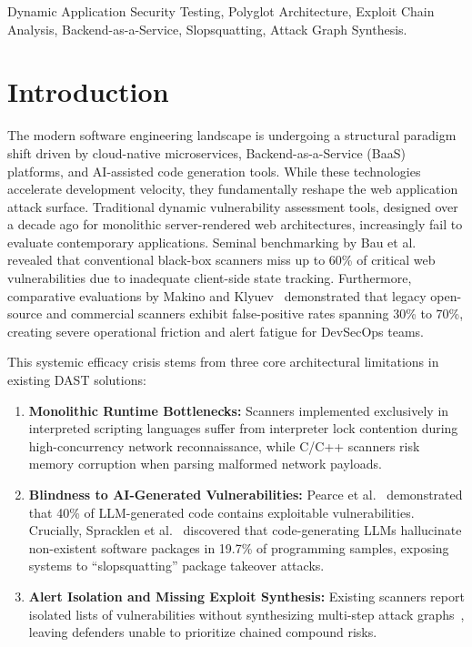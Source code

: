 \documentclass[conference]{IEEEtran}
\begin{document}
\begin{IEEEkeywords}
Dynamic Application Security Testing, Polyglot Architecture, Exploit Chain Analysis, Backend-as-a-Service, Slopsquatting, Attack Graph Synthesis.
\end{IEEEkeywords}

\section{Introduction}
The modern software engineering landscape is undergoing a structural paradigm shift driven by cloud-native microservices, Backend-as-a-Service (BaaS) platforms, and AI-assisted code generation tools. While these technologies accelerate development velocity, they fundamentally reshape the web application attack surface. Traditional dynamic vulnerability assessment tools, designed over a decade ago for monolithic server-rendered web architectures, increasingly fail to evaluate contemporary applications. Seminal benchmarking by Bau et al.~\cite{bau2010state} revealed that conventional black-box scanners miss up to 60\% of critical web vulnerabilities due to inadequate client-side state tracking. Furthermore, comparative evaluations by Makino and Klyuev~\cite{makino2015evaluation} demonstrated that legacy open-source and commercial scanners exhibit false-positive rates spanning 30\% to 70\%, creating severe operational friction and alert fatigue for DevSecOps teams.

This systemic efficacy crisis stems from three core architectural limitations in existing DAST solutions:
\begin{enumerate}
    \item \textbf{Monolithic Runtime Bottlenecks:} Scanners implemented exclusively in interpreted scripting languages suffer from interpreter lock contention during high-concurrency network reconnaissance, while C/C++ scanners risk memory corruption when parsing malformed network payloads.
    \item \textbf{Blindness to AI-Generated Vulnerabilities:} Pearce et al.~\cite{pearce2022copilot} demonstrated that 40\% of LLM-generated code contains exploitable vulnerabilities. Crucially, Spracklen et al.~\cite{spracklen2025slopsquatting} discovered that code-generating LLMs hallucinate non-existent software packages in 19.7\% of programming samples, exposing systems to ``slopsquatting'' package takeover attacks.
    \item \textbf{Alert Isolation and Missing Exploit Synthesis:} Existing scanners report isolated lists of vulnerabilities without synthesizing multi-step attack graphs~\cite{ou2005mulval}, leaving defenders unable to prioritize chained compound risks.
\end{enumerate}
\end{document}
